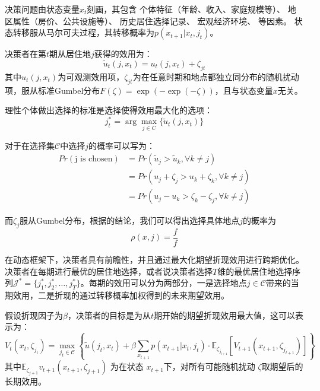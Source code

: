 \documentclass[a4paper,12pt,oneside]{book} %
\begin{document}
决策问题由状态变量$x_t$刻画，其包含
个体特征（年龄、收入、家庭规模等）、
地区属性（房价、公共设施等）、
历史居住选择记录、
宏观经济环境、
等因素。
状态转移服从马尔可夫过程，其转移概率为$p(x_{t+1}|x_t,j_t)$。

决策者在第$t$期从居住地$j$获得的效用为：
\begin{equation}
  \tilde{u}_t(j, x_t) = u_t(j, x_t) + \zeta_{jt}
\end{equation}
其中$u_t(j, x_t)$为可观测效用项，$\zeta_{jt}$为在任意时期和地点都独立同分布的随机扰动项，服从标准Gumbel分布$F(\zeta) = \exp(-\exp(-\zeta))$，且与状态变量$x$无关。


理性个体做出选择的标准是选择使得效用最大化的选项：
\begin{equation}
  j_t^* = \arg\max_{j \in C} \{\tilde{u}_t(j, x_t)\}
\end{equation}

对于在选择集$\mathcal{C}$中选择$j$的概率可以写为：
\begin{equation}
\begin{split}
  Pr(\text{j is chosen})&=Pr(\tilde u_j > \tilde u_k, \forall k \neq j)
  \\&=Pr(u_j+\zeta_j>u_k+\zeta_k, \forall k \neq j)
  \\&=Pr(u_j-u_k>\zeta_k-\zeta_j, \forall k \neq j)
\end{split}
\end{equation}

而$\zeta_j$服从Gumbel分布，根据\cite{mcfaddenConditionalLogitAnalysis1973}的结论，我们可以得出选择具体地点$j$的概率为
\begin{equation}
  \rho(x,j)=\frac{f}{f} 
  \label{McFadden1973result}
\end{equation}


在动态框架下，决策者具有前瞻性，并且通过最大化期望折现效用进行跨期优化。决策者在每期进行最优的居住地选择，或者说决策者选择$T$维的最优居住地选择序列$\mathcal{J}^*=\{j_1^*,j_2^*,\ldots,j_T^*\}$。每期的效用可以分为两部分，一是选择地点$j \in \mathcal{C}$带来的当期效用，二是折现的通过转移概率加权得到的未来期望效用。

假设折现因子为$\beta$，决策者的目标是为从$t$期开始的期望折现效用最大值，这可以表示为：
\begin{equation}
  V_t(x_t, \zeta_{j_t}) = \max_{j_t \in \mathcal{C}} 
  \left\{ 
  \tilde{u}(j_t, x_t) + \beta \sum_{x_{t+1}} p(x_{t+1} | x_t, j_t) \cdot \mathbb{E}_{\zeta_{j_{t+1}}} [ V_{t+1}(x_{t+1}, \zeta_{j_{t+1}}) ]
  \right\}
\end{equation}
其中$\mathbb{E}_{\zeta_{j+1}} v_{t+1}(x_{t+1},\zeta_{j+1})$
为在状态 
$x_{t+1}$下，对所有可能随机扰动 
$\zeta$取期望后的长期效用。
\end{document}
